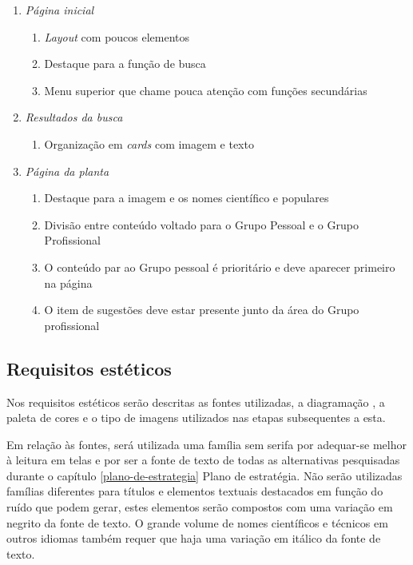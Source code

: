 \begin{enumerate}
\def\labelenumi{\arabic{enumi}.}
\tightlist
\item
  \emph{Página inicial}

  \begin{enumerate}
  \def\labelenumii{\arabic{enumii}.}
  \tightlist
  \item
    \emph{Layout} com poucos elementos
  \item
    Destaque para a função de busca
  \item
    Menu superior que chame pouca atenção com funções secundárias
  \end{enumerate}
\item
  \emph{Resultados da busca}

  \begin{enumerate}
  \def\labelenumii{\arabic{enumii}.}
  \tightlist
  \item
    Organização em \emph{cards} com imagem e texto
  \end{enumerate}
\item
  \emph{Página da planta}

  \begin{enumerate}
  \def\labelenumii{\arabic{enumii}.}
  \tightlist
  \item
    Destaque para a imagem e os nomes científico e populares
  \item
    Divisão entre conteúdo voltado para o Grupo Pessoal e o Grupo Profissional
  \item
    O conteúdo par ao Grupo pessoal é prioritário e deve aparecer primeiro na página
  \item
    O item de sugestões deve estar presente junto da área do Grupo profissional
  \end{enumerate}
\end{enumerate}

\subsection{Requisitos estéticos}\label{requisitos-esteticos}

Nos requisitos estéticos serão descritas as fontes utilizadas, a diagramação , a paleta de cores e o tipo de imagens utilizados nas etapas subsequentes a esta.

Em relação às fontes, será utilizada uma família sem serifa por adequar-se melhor à leitura em telas e por ser a fonte de texto de todas as alternativas pesquisadas durante o capítulo \ref{plano-de-estrategia} Plano de estratégia. Não serão utilizadas famílias diferentes para títulos e elementos textuais destacados em função do ruído que podem gerar, estes elementos serão compostos com uma variação em negrito da fonte de texto. O grande volume de nomes científicos e técnicos em outros idiomas também requer que haja uma variação em itálico da fonte de texto.

